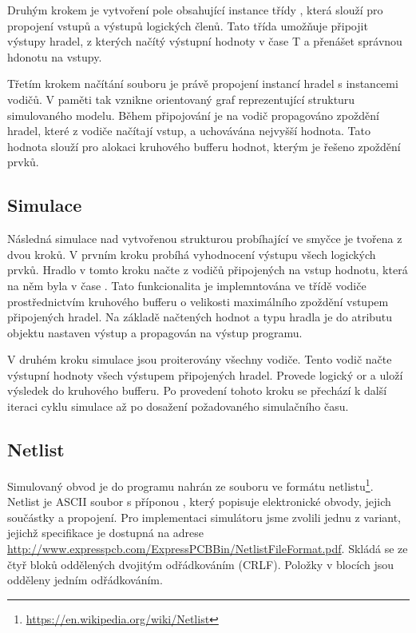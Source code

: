 \documentclass[11pt,a4paper]{article}
\begin{document}
			Druhým krokem je vytvoření pole obsahující instance třídy , která slouží pro propojení vstupů a výstupů logických členů. Tato třída umožňuje připojit výstupy hradel, z kterých načítý výstupní hodnoty v čase T a přenášet správnou hdonotu na vstupy.

			Třetím krokem načítání souboru je právě propojení instancí hradel s instancemi vodičů. V paměti tak vznikne orientovaný graf reprezentující strukturu simulovaného modelu. Během připojování je na vodič propagováno zpoždění hradel, které z vodiče načítají vstup, a uchovávána nejvyšší hodnota. Tato hodnota slouží pro alokaci kruhového bufferu hodnot, kterým je řešeno zpoždění prvků.

		\subsection{Simulace}
			Následná simulace nad vytvořenou strukturou probíhající ve smyčce je tvořena z dvou kroků. V prvním kroku probíhá vyhodnocení výstupu všech logických prvků. Hradlo v tomto kroku načte z vodičů připojených na vstup hodnotu, která na něm byla v čase . Tato funkcionalita je implemntována ve třídě vodiče prostřednictvím kruhového bufferu o velikosti maximálního zpoždění vstupem připojených hradel. Na základě načtených hodnot a typu hradla je do atributu objektu nastaven výstup a propagován na výstup programu.

			V druhém kroku simulace jsou proiterovány všechny vodiče. Tento vodič načte výstupní hodnoty všech výstupem připojených hradel. Provede logický or a uloží výsledek do kruhového bufferu. Po provedení tohoto kroku se přechází k další iteraci cyklu simulace až po dosažení požadovaného simulačního času.

		\subsection{Netlist}
			\label{netlist}

			Simulovaný obvod je do programu nahrán ze souboru ve formátu netlistu\footnote{\url{https://en.wikipedia.org/wiki/Netlist}}. Netlist je ASCII soubor s příponou , který popisuje elektronické obvody, jejich součástky a propojení. Pro implementaci simulátoru jsme zvolili jednu z variant, jejichž specifikace je dostupná na adrese \url{http://www.expresspcb.com/ExpressPCBBin/NetlistFileFormat.pdf}.
			Skládá se ze čtyř bloků oddělených dvojitým odřádkováním (CRLF). Položky v blocích jsou odděleny jedním odřádkováním.
\end{document}
